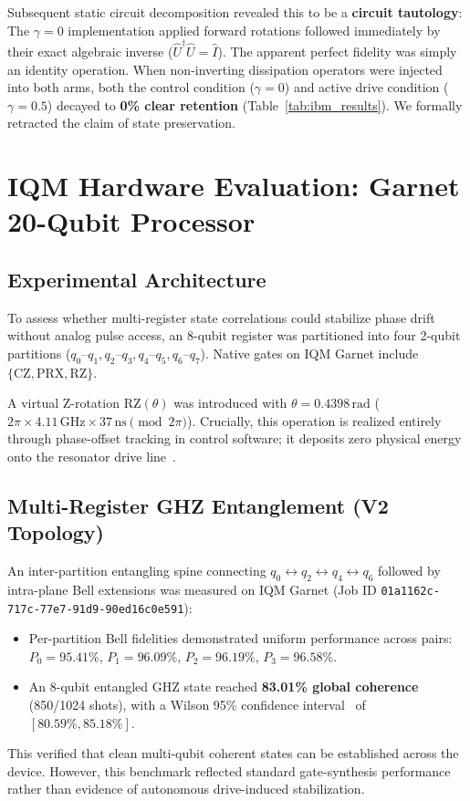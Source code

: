 \documentclass[11pt,a4paper]{article}
\begin{document}
Subsequent static circuit decomposition revealed this to be a \textbf{circuit tautology}:
The $\gamma=0$ implementation applied forward rotations followed immediately by their exact algebraic inverse ($\hat{U}^{\dagger}\hat{U} = \hat{I}$). The apparent perfect fidelity was simply an identity operation. When non-inverting dissipation operators were injected into both arms, both the control condition ($\gamma=0$) and active drive condition ($\gamma=0.5$) decayed to \textbf{0\% clear retention} (Table~\ref{tab:ibm_results}). We formally retracted the claim of state preservation.

\section{IQM Hardware Evaluation: Garnet 20-Qubit Processor}

\subsection{Experimental Architecture}
To assess whether multi-register state correlations could stabilize phase drift without analog pulse access, an 8-qubit register was partitioned into four 2-qubit partitions ($q_0\text{--}q_1, q_2\text{--}q_3, q_4\text{--}q_5, q_6\text{--}q_7$). Native gates on IQM Garnet include $\{\text{CZ}, \text{PRX}, \text{RZ}\}$.

A virtual Z-rotation $\text{RZ}(\theta)$ was introduced with $\theta = 0.4398\,\text{rad}$ ($2\pi \times 4.11\,\text{GHz} \times 37\,\text{ns} \pmod{2\pi}$). Crucially, this operation is realized entirely through phase-offset tracking in control software; it deposits zero physical energy onto the resonator drive line~\cite{mckay2017gates}.

\subsection{Multi-Register GHZ Entanglement (V2 Topology)}
An inter-partition entangling spine connecting $q_0 \leftrightarrow q_2 \leftrightarrow q_4 \leftrightarrow q_6$ followed by intra-plane Bell extensions was measured on IQM Garnet (Job ID \texttt{01a1162c-717c-77e7-91d9-90ed16c0e591}):
\begin{itemize}
  \item Per-partition Bell fidelities demonstrated uniform performance across pairs: $P_0 = 95.41\%$, $P_1 = 96.09\%$, $P_2 = 96.19\%$, $P_3 = 96.58\%$.
  \item An 8-qubit entangled GHZ state reached \textbf{83.01\% global coherence} (850/1024 shots), with a Wilson 95\% confidence interval~\cite{wilson1927interval} of $[80.59\%, 85.18\%]$.
\end{itemize}
This verified that clean multi-qubit coherent states can be established across the device. However, this benchmark reflected standard gate-synthesis performance rather than evidence of autonomous drive-induced stabilization.
\end{document}
